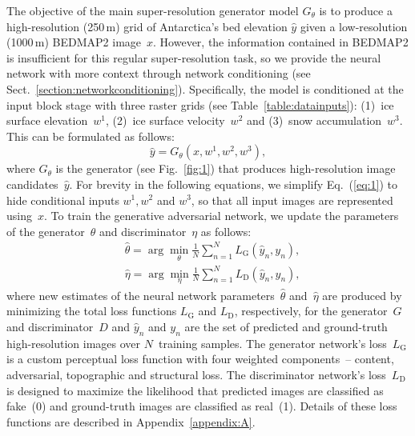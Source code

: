 \documentclass[tc, noline]{copernicus}
\begin{document}
The objective of the main super-resolution generator model $G_\theta$ is to produce a high-resolution (250\,\unit{m}) grid of Antarctica's bed
elevation $\hat{y}$ given a low-resolution (1000\,\unit{m}) BEDMAP2 \citep{FretwellBedmap2improvedice2013} image~$x$. However, the information
contained in BEDMAP2 is insufficient for this regular super-resolution task, so we provide the neural network with more context through network
conditioning (see Sect.~\ref{section:networkconditioning}). Specifically, the model is conditioned at the input block stage with three raster grids
(see Table~\ref{table:datainputs}): (1)~ice surface elevation~$w^1$, (2)~ice surface velocity~$w^2$ and (3)~snow accumulation~$w^3$. This can be
formulated as follows:
\begin{equation}\label{eq:1}
\hat{y} = G_\theta(x, w^1, w^2, w^3),
\end{equation}
where $G_\theta$ is the generator (see Fig.~\ref{fig:1}) that produces high-resolution image candidates~$\hat{y}$. For brevity in the following
equations, we simplify Eq.~(\ref{eq:1}) to hide conditional inputs $w^1, w^2$ and  $w^3$, so that all input images are represented using~$x$. To train the
generative adversarial network, we update the parameters of the generator~$\theta$ and discriminator~$\eta$ as follows:
\begin{align}
&\hat{\theta} = \arg\min_{\theta} \frac{1}{N}\sum_{n=1}^{N}L_{\mathrm{G}}(\hat{y}_n, y_n), \label{eq:2}\\
&\hat{\eta} = \arg\min_{\eta} \frac{1}{N}\sum_{n=1}^{N}L_{\mathrm{D}}(\hat{y}_n, y_n), \label{eq:3}
\end{align}
where new estimates of the neural network parameters~$\hat{\theta}$ and~$\hat{\eta}$ are produced by minimizing the total loss functions $L_{\mathrm{G}}$ and
$L_{\mathrm{D}}$, respectively, for the generator~$G$ and discriminator~$D$ and $\hat{y}_n$ and $y_n$ are the set of predicted and ground-truth high-resolution
images over $N$~training samples. The generator network's loss~$L_{\mathrm{G}}$ is a custom perceptual loss function with four weighted components~-- content,
adversarial, topographic and structural loss. The discriminator network's loss~$L_{\mathrm{D}}$ is designed to maximize the likelihood that predicted images are
classified as fake~(0) and ground-truth images are classified as real~(1). Details of these loss functions are described in Appendix~\ref{appendix:A}.
\end{document}
